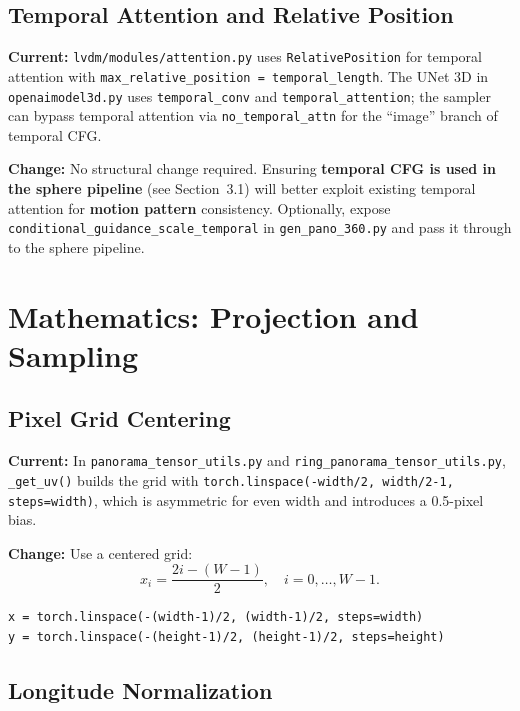 \documentclass[11pt,a4paper]{article}
\newcommand{\file}[1]{\texttt{#1}}
\newcommand{\fn}[1]{\texttt{#1}}
\begin{document}
\subsection{Temporal Attention and Relative Position}

\textbf{Current:} \file{lvdm/modules/attention.py} uses \fn{RelativePosition} for temporal attention with \fn{max\_relative\_position = temporal\_length}. The UNet 3D in \file{openaimodel3d.py} uses \fn{temporal\_conv} and \fn{temporal\_attention}; the sampler can bypass temporal attention via \fn{no\_temporal\_attn} for the “image” branch of temporal CFG.

\textbf{Change:} No structural change required. Ensuring \textbf{temporal CFG is used in the sphere pipeline} (see Section~3.1) will better exploit existing temporal attention for \textbf{motion pattern} consistency. Optionally, expose \fn{conditional\_guidance\_scale\_temporal} in \file{gen\_pano\_360.py} and pass it through to the sphere pipeline.

\section{Mathematics: Projection and Sampling}

\subsection{Pixel Grid Centering}

\textbf{Current:} In \file{panorama\_tensor\_utils.py} and \file{ring\_panorama\_tensor\_utils.py}, \fn{\_get\_uv()} builds the grid with \fn{torch.linspace(-width/2, width/2-1, steps=width)}, which is asymmetric for even width and introduces a 0.5-pixel bias.

\textbf{Change:} Use a centered grid:
\begin{equation}
x_i = \frac{2i - (W-1)}{2}, \quad i=0,\ldots,W-1.
\end{equation}
\begin{lstlisting}
x = torch.linspace(-(width-1)/2, (width-1)/2, steps=width)
y = torch.linspace(-(height-1)/2, (height-1)/2, steps=height)
\end{lstlisting}

\subsection{Longitude Normalization}
\end{document}
